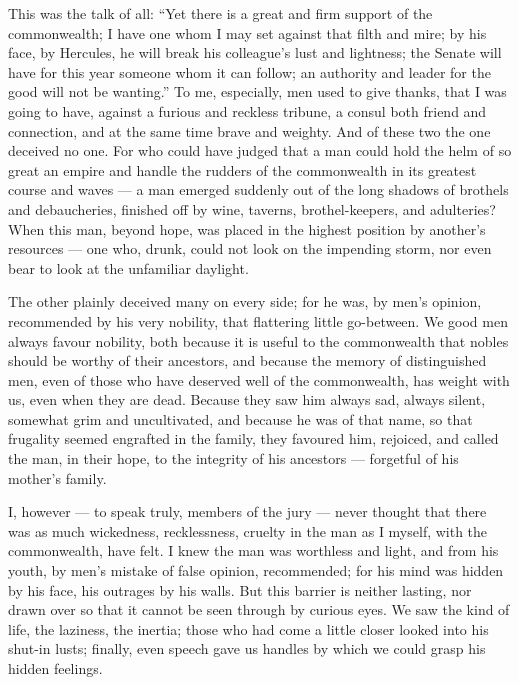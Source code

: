  This was the talk of all: ``Yet there is a great and firm support of the commonwealth; I have one whom I may set against that filth and mire; by his face, by Hercules, he will break his colleague's lust and lightness; the Senate will have for this year someone whom it can follow; an authority and leader for the good will not be wanting.'' To me, especially, men used to give thanks, that I was going to have, against a furious and reckless tribune, a consul both friend and connection, and at the same time brave and weighty. And of these two the one deceived no one. For who could have judged that a man could hold the helm of so great an empire and handle the rudders of the commonwealth in its greatest course and waves --- a man emerged suddenly out of the long shadows of brothels and debaucheries, finished off by wine, taverns, brothel-keepers, and adulteries? When this man, beyond hope, was placed in the highest position by another's resources --- one who, drunk, could not look on the impending storm, nor even bear to look at the unfamiliar daylight.

 The other plainly deceived many on every side; for he was, by men's opinion, recommended by his very nobility, that flattering little go-between. We good men always favour nobility, both because it is useful to the commonwealth that nobles should be worthy of their ancestors, and because the memory of distinguished men, even of those who have deserved well of the commonwealth, has weight with us, even when they are dead. Because they saw him always sad, always silent, somewhat grim and uncultivated, and because he was of that name, so that frugality seemed engrafted in the family, they favoured him, rejoiced, and called the man, in their hope, to the integrity of his ancestors --- forgetful of his mother's family.

 I, however --- to speak truly, members of the jury --- never thought that there was as much wickedness, recklessness, cruelty in the man as I myself, with the commonwealth, have felt. I knew the man was worthless and light, and from his youth, by men's mistake of false opinion, recommended; for his mind was hidden by his face, his outrages by his walls. But this barrier is neither lasting, nor drawn over so that it cannot be seen through by curious eyes. We saw the kind of life, the laziness, the inertia; those who had come a little closer looked into his shut-in lusts; finally, even speech gave us handles by which we could grasp his hidden feelings.

